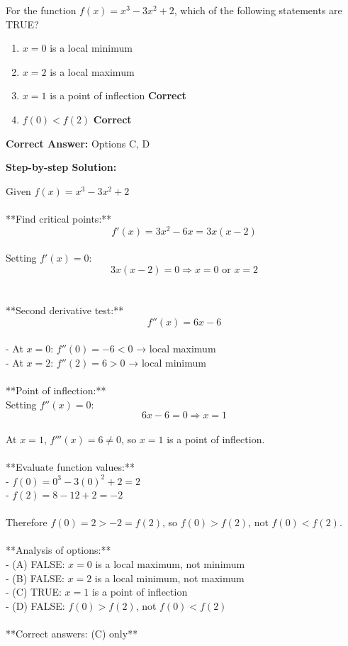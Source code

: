 \documentclass[11pt]{article}
\begin{document}
For the function \(f(x) = x^3 - 3x^2 + 2\), which of the following statements are TRUE?


\begin{enumerate}[label=\textbf{\Alph*.}, leftmargin=1.8em]
\item \(x = 0\) is a local minimum\item \(x = 2\) is a local maximum\item \(x = 1\) is a point of inflection \hfill {\color{gategreen}\textbf{Correct}}\item \(f(0) < f(2)\) \hfill {\color{gategreen}\textbf{Correct}}\end{enumerate}

\textbf{Correct Answer:} Options C, D

\textbf{Step-by-step Solution:}

Given \(f(x) = x^3 - 3x^2 + 2\)\\
\\
**Find critical points:**\\
\[f'(x) = 3x^2 - 6x = 3x(x - 2)\]\\
Setting \(f'(x) = 0\):\\
\[3x(x - 2) = 0 \Rightarrow x = 0 \text{ or } x = 2\]\\
\\
**Second derivative test:**\\
\[f''(x) = 6x - 6\]\\
- At \(x = 0\): \(f''(0) = -6 < 0\) → local maximum\\
- At \(x = 2\): \(f''(2) = 6 > 0\) → local minimum\\
\\
**Point of inflection:**\\
Setting \(f''(x) = 0\):\\
\[6x - 6 = 0 \Rightarrow x = 1\]\\
At \(x = 1\), \(f'''(x) = 6 \neq 0\), so \(x = 1\) is a point of inflection.\\
\\
**Evaluate function values:**\\
- \(f(0) = 0^3 - 3(0)^2 + 2 = 2\)\\
- \(f(2) = 8 - 12 + 2 = -2\)\\
\\
Therefore \(f(0) = 2 > -2 = f(2)\), so \(f(0) > f(2)\), not \(f(0) < f(2)\).\\
\\
**Analysis of options:**\\
- (A) FALSE: \(x = 0\) is a local maximum, not minimum\\
- (B) FALSE: \(x = 2\) is a local minimum, not maximum\\
- (C) TRUE: \(x = 1\) is a point of inflection\\
- (D) FALSE: \(f(0) > f(2)\), not \(f(0) < f(2)\)\\
\\
**Correct answers: (C) only**
\end{document}
